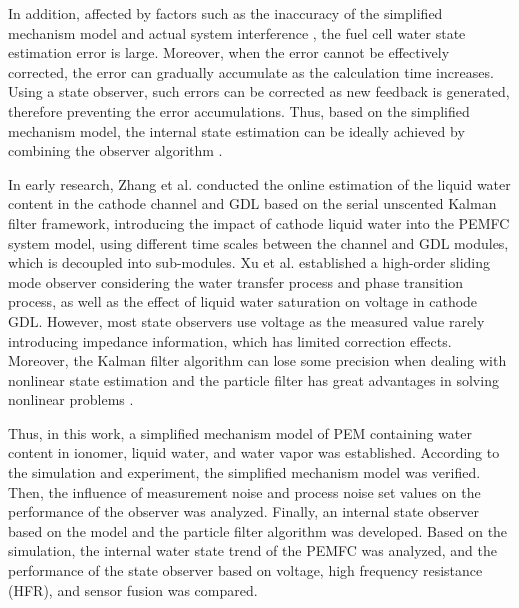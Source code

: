\par
In addition, affected by factors such as the inaccuracy of the simplified mechanism model and actual system interference \cite{huThreeDimensionalTwo2004}, the fuel cell water state estimation error is large. Moreover, when the error cannot be effectively corrected, the error can gradually accumulate as the calculation time increases\cite{liuPrognosticsMethodsDegradation2020}. Using a state observer, such errors can be corrected as new feedback is generated, therefore preventing the error accumulations. Thus, based on the simplified mechanism model, the internal state estimation can be ideally achieved by combining the observer algorithm \cite{yuanModelbasedObserversInternal2020a}.
\par
In early research, Zhang et al.\cite{zhangUnscentedKalmanFilter2020} conducted the online estimation of the liquid water content in the cathode channel and GDL based on the serial unscented Kalman filter framework, introducing the impact of cathode liquid water into the PEMFC system model, using different time scales between the channel and GDL modules, which is decoupled into sub-modules. Xu et al.\cite{xuNonlinearObservationInternal2017} established a high-order sliding mode observer considering the water transfer process and phase transition process, as well as the effect of liquid water saturation on voltage in cathode GDL\cite{moradinafchiAnionExchangeMembrane2024}. However, most state observers use voltage as the measured value rarely introducing impedance information, which has limited correction effects\cite{farcasAdaptiveControlMembrane2014}. Moreover, the Kalman filter algorithm can lose some precision when dealing with nonlinear state estimation and the particle filter has great advantages in solving nonlinear problems \cite{ParticleFiltering,vandermerweSquarerootUnscentedKalman2001}.
\par
Thus, in this work, a simplified mechanism model of PEM containing water content in ionomer, liquid water, and water vapor was established. According to the simulation and experiment, the simplified mechanism model was verified. Then, the influence of measurement noise and process noise set values on the performance of the observer was analyzed. Finally, an internal state observer based on the model and the particle filter algorithm was developed. Based on the simulation, the internal water state trend of the PEMFC was analyzed, and the performance of the state observer based on voltage, high frequency resistance (HFR), and sensor fusion was compared.